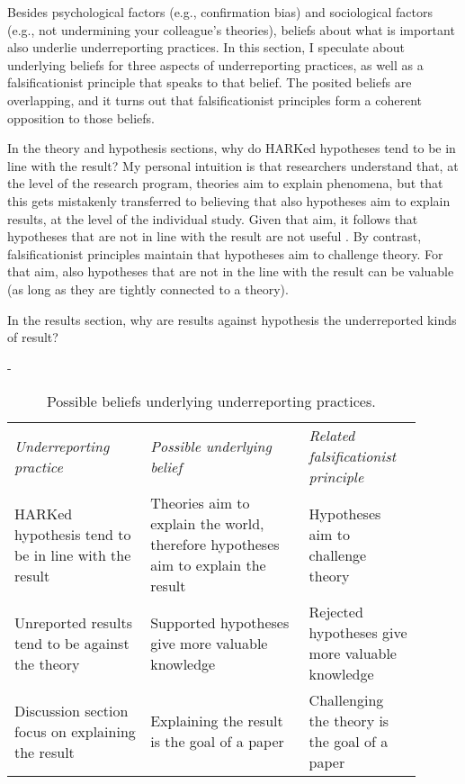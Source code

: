 \documentclass[twocolumn, 10pt]{article}
\newlength{\fullwidthlen}
\newenvironment{fullwidth}{%
  \begin{adjustwidth}{-\fullwidthlen}{}%
}{%
  \end{adjustwidth}%
}
\begin{document}
Besides psychological factors (e.g., confirmation bias) and sociological factors (e.g., not undermining your colleague's theories), beliefs about what is important also underlie underreporting practices. In this section, I speculate about underlying beliefs for three aspects of underreporting practices, as well as a falsificationist principle that speaks to that belief. The posited beliefs are overlapping, and it turns out that falsificationist principles form a coherent opposition to those beliefs.



In the theory and hypothesis sections, why do HARKed hypotheses tend to be in line with the result? My personal intuition is that researchers understand that, at the level of the research program, theories aim to explain phenomena, but that this gets mistakenly transferred to believing that also hypotheses aim to explain results, at the level of the individual study. Given that aim, it follows that hypotheses that are not in line with the result are not useful \parencite{Johns2019}. By contrast, falsificationist principles maintain that hypotheses aim to challenge theory. For that aim, also hypotheses that are not in the line with the result can be valuable (as long as they are tightly connected to a theory).

In the results section, why are results against hypothesis the underreported kinds of result?
\clearpage

\begin{table}[t!]
  \begin{fullwidth}

    \caption{Possible beliefs underlying underreporting practices.}
    \label{tab:1}

    \begin{tabularx}{\columnwidth}{@{}>{\RaggedRight\arraybackslash}p{0.3\linewidth} >{\RaggedRight\arraybackslash}p{0.35\linewidth} >{\RaggedRight\arraybackslash}p{0.25\linewidth}@{}}

      \emph{Underreporting practice}                       &
      \emph{Possible underlying belief}                    & \emph{Related falsificationist principle}                                                                                            \\
      HARKed hypothesis tend to be in line with the result & Theories aim to explain the world, therefore hypotheses aim to explain the result & Hypotheses aim to challenge theory               \\
      Unreported results tend to be against the theory     & Supported hypotheses give more valuable knowledge                                 & Rejected hypotheses give more valuable knowledge \\
      Discussion section focus on explaining the result    & Explaining the result is the goal of a paper                                      & Challenging the theory is the goal of a paper    \\
    \end{tabularx}
  \end{fullwidth}


\end{table}
\end{document}
